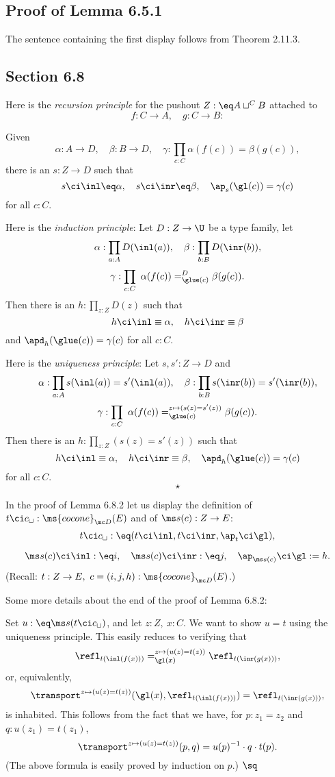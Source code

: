 \documentclass[12pt]{article}
\begin{document}

\subsection{Proof of Lemma 6.5.1}

The sentence containing the first display follows from Theorem 2.11.3.


\subsection{Section 6.8}

Here is the \emph{recursion principle} for the pushout $Z:\eq A\sqcup^CB$ attached to 
$$
f:C\to A,\quad g:C\to B:
$$ 

Given 
$$
\alpha:A\to D,\quad\beta:B\to D,\quad\gamma:\prod_{c:C}\alpha(f(c))=\beta(g(c)),
$$ 
there is an $s:Z\to D$ such that 
$$
s\ci\inl\eq\alpha,\quad s\ci\inr\eq\beta,\quad\ap_s(\gl(c))=\gamma(c)
$$ 
for all $c:C$.

Here is the \emph{induction principle}: Let $D:Z\to\U$ be a type family, let 
$$
\alpha:\prod_{a:A}D(\inl(a)),\quad\beta:\prod_{b:B}D(\inr(b)),
$$
$$
\gamma:\prod_{c:C}\ \alpha(f(c))=^D_{\glue(c)}\beta(g(c)).
$$ 
Then there is an $h:\prod_{z:Z}D(z)$ such that 
$$
h\ci\inl\equiv\alpha,\quad h\ci\inr\equiv\beta
$$ 
and $\apd_h(\glue(c))=\gamma(c)$ for all $c:C$. 

Here is the \emph{uniqueness principle}: Let $s,s':Z\to D$ and 
$$
\alpha:\prod_{a:A}s(\inl(a))=s'(\inl(a)),\quad\beta:\prod_{b:B}s(\inr(b))=s'(\inr(b)),
$$
$$
\gamma:\prod_{c:C}\ \alpha(f(c))=^{z\mapsto(s(z)=s'(z))}_{\glue(c)}\beta(g(c)).
$$ 
Then there is an $h:\prod_{z:Z}(s(z)=s'(z))$ such that 
$$
h\ci\inl\equiv\alpha,\quad h\ci\inr\equiv\beta,\quad\apd_h(\glue(c))=\gamma(c)
$$ 
for all $c:C$. 
$$
\star
$$

In the proof of Lemma 6.8.2 let us display the definition of $t\ci c_{\sqcup}:\ms{cocone}_{\mc D}(E)$ and of $\ms s(c):Z\to E$: 
$$
t\ci c_{\sqcup}:\eq(t\ci\inl,t\ci\inr,\ap_t\ci\gl),
$$ 

$$
\ms s(c)\ci\inl:\eq i,\quad\ms s(c)\ci\inr :\eq j,\quad\ap_{\ms s(c)}\ci\gl:=h.
$$ 
(Recall: $t:Z\to E,\ c=(i,j,h):\ms{cocone}_{\mc D}(E)$.)

Some more details about the end of the proof of Lemma 6.8.2:

Set $u:\eq\ms s(t\ci c_\sqcup)$, and let $z:Z,\ x:C$. We want to show $u=t$ using the uniqueness principle. This easily reduces to verifying that 
$$
\refl_{t(\inl(f(x)))}=_{\gl(x)}^{z\mapsto(u(z)=t(z))}\refl_{t(\inr(g(x)))},
$$ 
or, equivalently, 
$$
\transport^{z\mapsto(u(z)=t(z))}(\gl(x),\refl_{t(\inl(f(x)))})=\refl_{t(\inr(g(x)))},
$$ 
is inhabited. This follows from the fact that we have, for $p:z_1=z_2$ and $q:u(z_1)=t(z_1)$, 
$$
\transport^{z\mapsto(u(z)=t(z))}(p,q)=u(p)^{-1}\cdot q\cdot t(p).
$$ 
(The above formula is easily proved by induction on $p$.) $\sq$
\end{document}
